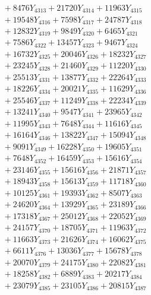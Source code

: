 \documentclass[a4paper,10pt]{article}
\begin{document}
{\begin{align}
&\;  + 8476 Y_{4313} + 21720 Y_{4314} + 11963 Y_{4315} \\[0.3ex]
&\;  + 19548 Y_{4316} + 7598 Y_{4317} + 24787 Y_{4318} \\[0.5ex]\allowbreak
&\;  + 12832 Y_{4319} + 9849 Y_{4320} + 6465 Y_{4321} \\[0.3ex]
&\;  + 7586 Y_{4322} + 13457 Y_{4323} + 9467 Y_{4324} \\[0.3ex]
&\;  + 16732 Y_{4325} + 20046 Y_{4326} + 18232 Y_{4327} \\[0.3ex]
&\;  + 23245 Y_{4328} + 21460 Y_{4329} + 11220 Y_{4330} \\[0.3ex]
&\;  + 25513 Y_{4331} + 13877 Y_{4332} + 22264 Y_{4333} \\[0.3ex]
&\;  + 18226 Y_{4334} + 20021 Y_{4335} + 11629 Y_{4336} \\[0.3ex]
&\;  + 25546 Y_{4337} + 11249 Y_{4338} + 22234 Y_{4339} \\[0.3ex]
&\;  + 13241 Y_{4340} + 9547 Y_{4341} + 23965 Y_{4342} \\[0.3ex]
&\;  + 11995 Y_{4343} + 7648 Y_{4344} + 11616 Y_{4345} \\[0.3ex]
&\;  + 16164 Y_{4346} + 13822 Y_{4347} + 15094 Y_{4348} \\[0.5ex]\allowbreak
&\;  + 9091 Y_{4349} + 16228 Y_{4350} + 19605 Y_{4351} \\[0.3ex]
&\;  + 7648 Y_{4352} + 16459 Y_{4353} + 15616 Y_{4354} \\[0.3ex]
&\;  + 23146 Y_{4355} + 15616 Y_{4356} + 21871 Y_{4357} \\[0.3ex]
&\;  + 18943 Y_{4358} + 15613 Y_{4359} + 11718 Y_{4360} \\[0.3ex]
&\;  + 10125 Y_{4361} + 19393 Y_{4362} + 8507 Y_{4363} \\[0.3ex]
&\;  + 24620 Y_{4364} + 13929 Y_{4365} + 23189 Y_{4366} \\[0.3ex]
&\;  + 17318 Y_{4367} + 25012 Y_{4368} + 22052 Y_{4369} \\[0.3ex]
&\;  + 24157 Y_{4370} + 18705 Y_{4371} + 11963 Y_{4372} \\[0.3ex]
&\;  + 11663 Y_{4373} + 21626 Y_{4374} + 16062 Y_{4375} \\[0.3ex]
&\;  + 6611 Y_{4376} + 13036 Y_{4377} + 15678 Y_{4378} \\[0.5ex]\allowbreak
&\;  + 20070 Y_{4379} + 24175 Y_{4380} + 22082 Y_{4381} \\[0.3ex]
&\;  + 18258 Y_{4382} + 6889 Y_{4383} + 20217 Y_{4384} \\[0.3ex]
&\;  + 23079 Y_{4385} + 23105 Y_{4386} + 20815 Y_{4387} \\[0.3ex]

\end{align}}
\end{document}
